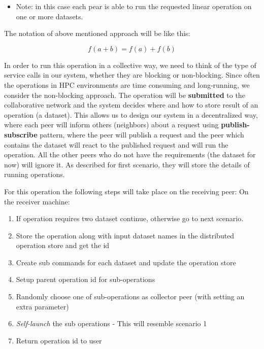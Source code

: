 \begin{itemize}
\item Note: in this case each pear is able to run the requested linear operation on one or more datasets.
\end{itemize}

The notation of above mentioned approach will be like this:

\[ f(a + b) = f(a) + f(b) \]

In order to run this operation in a collective way, 
we need to think of the type of service calls in our system, 
whether they are blocking or non-blocking. 
Since often the operations in HPC environments are time consuming and long-running, 
we consider the non-blocking approach. 
The operation will be \textbf{submitted} to the collaborative network and
the system decides where and how to store result of an operation (a dataset).
This allows us to design our system in a decentralized way, 
where each peer will inform others (neighbors) about a request using \textbf{publish-subscribe} pattern, 
where the peer will publish a request and the peer which contains 
the dataset will react to the published request and will run the operation. 
All the other peers who do not have the requirements (the dataset for now) will ignore it.
As described for first scenario, 
they will store the details of running operations.


For this operation the following steps will take place on the receiving peer:
On the receiver machine:
\begin{enumerate}
\item If operation requires two dataset continue, otherwise go to next scenario.
\item Store the operation along with input dataset names in the distributed operation store and get the id
\item Create sub commands for each dataset and update the operation store
\item Setup parent operation id for sub-operations
\item Randomly choose one of sub-operations as collector peer (with setting an extra parameter)
\item \textit{Self-launch} the sub operations - This will resemble scenario 1
\item Return operation id to user
\end{enumerate}


